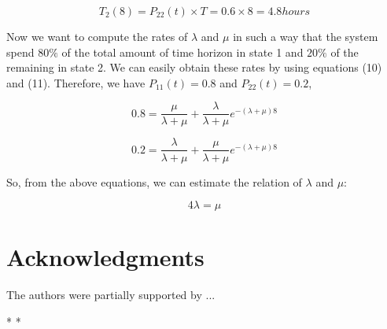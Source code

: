\documentclass[12pt,letterpaper]{article}
\begin{document}
\begin{equation}
T_2(8)=P_{22}(t)\times T= 0.6 \times 8=4.8 hours
\end{equation}

Now we want to compute the rates of $\lambda$ and $\mu$ in such a way that the system spend $80\%$ of the total amount of time horizon in state 1 and $20\%$ of the remaining in state 2. We can easily obtain these rates by using equations (10) and (11). Therefore,
we have $P_{11}(t)=0.8$ and $P_{22}(t)=0.2$,

\begin{equation}
0.8=\frac{\mu}{\lambda +\mu}+\frac{\lambda}{\lambda +\mu} e^{-(\lambda +\mu)8}
\end{equation}

\begin{equation}
0.2=\frac{\lambda}{\lambda +\mu}+\frac{\mu}{\lambda +\mu} e^{-(\lambda +\mu)8}
\end{equation}

So, from the above equations, we can estimate the relation of $\lambda$ and $\mu$:

\begin{equation}
4\lambda=\mu
\end{equation}








\section*{Acknowledgments}
The authors were partially supported by ...




*
*


\end{document}
